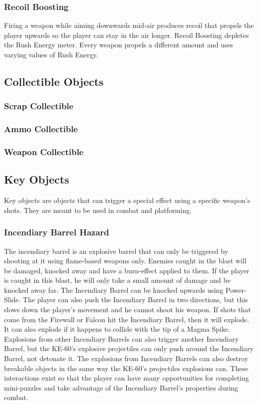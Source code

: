 \documentclass[12pt]{article}
\begin{document}
\subsubsection{Recoil Boosting}

Firing a weapon while aiming downwards mid-air produces recoil that propels the player upwards so the player can stay in the air longer. Recoil Boosting depletes the Rush Energy meter. Every weapon propels a different amount and uses varying values of Rush Energy. 

\subsection{Collectible Objects}

\subsubsection{Scrap Collectible}

\subsubsection{Ammo Collectible}

\subsubsection{Weapon Collectible}

\subsection{Key Objects}

Key objects are objects that can trigger a special effect using a specific weapon's shots. They are meant to be used in combat and platforming.

\subsubsection{Incendiary Barrel Hazard}

The incendiary barrel is an explosive barrel that can only be triggered by shooting at it using flame-based weapons only. Enemies caught in the blast will be damaged, knocked away and have a burn-effect applied to them. If the player is caught in this blast, he will only take a small amount of damage and be knocked away far. The Incendiary Barrel can be knocked upwards using Power-Slide. The player can also push the Incendiary Barrel in two directions, but this slows down the player's movement and he cannot shoot his weapon. If shots that come from the Firewall or Falcon hit the Incendiary Barrel, then it will explode. It can also explode if it happens to collide with the tip of a Magma Spike. Explosions from other Incendiary Barrels can also trigger another Incendiary Barrel, but the KE-60's explosive projectiles can only push around the Incendiary Barrel, not detonate it. The explosions from Incendiary Barrels can also destroy breakable objects in the same way the KE-60's projectiles explosions can. These interactions exist so that the player can have many opportunities for completing mini-puzzles and take advantage of the Incendiary Barrel's properties during combat. 
\end{document}
